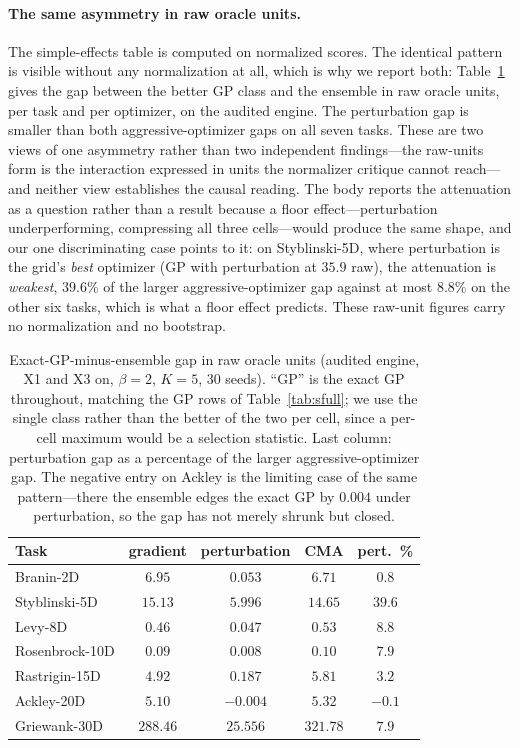 \documentclass[letterpaper]{article}
\theoremstyle{plain}
\begin{document}
\paragraph{The same asymmetry in raw oracle units.} The simple-effects table is computed on normalized scores. The identical pattern is visible without any normalization at all, which is why we report both: Table~\ref{tab:rawgap} gives the gap between the better GP class and the ensemble in raw oracle units, per task and per optimizer, on the audited engine. The perturbation gap is smaller than both aggressive-optimizer gaps on all seven tasks. These are two views of one asymmetry rather than two independent findings---the raw-units form is the interaction expressed in units the normalizer critique cannot reach---and neither view establishes the causal reading. The body reports the attenuation as a question rather than a result because a floor effect---perturbation underperforming, compressing all three cells---would produce the same shape, and our one discriminating case points to it: on Styblinski-5D, where perturbation is the grid's \emph{best} optimizer (GP with perturbation at $35.9$ raw), the attenuation is \emph{weakest}, $39.6\%$ of the larger aggressive-optimizer gap against at most $8.8\%$ on the other six tasks, which is what a floor effect predicts. These raw-unit figures carry no normalization and no bootstrap.

\begin{table}[t]\centering
\caption{Exact-GP-minus-ensemble gap in raw oracle units (audited engine, X1 and X3 on, $\beta{=}2$, $K{=}5$, 30 seeds). ``GP'' is the exact GP throughout, matching the GP rows of Table~\ref{tab:sfull}; we use the single class rather than the better of the two per cell, since a per-cell maximum would be a selection statistic. Last column: perturbation gap as a percentage of the larger aggressive-optimizer gap. The negative entry on Ackley is the limiting case of the same pattern---there the ensemble edges the exact GP by $0.004$ under perturbation, so the gap has not merely shrunk but closed.}
\label{tab:rawgap}
\setlength{\tabcolsep}{4pt}\small
\begin{tabular}{lcccc}
\toprule
Task & gradient & perturbation & CMA & pert.\ \% \\
\midrule
Branin-2D      & $6.95$   & $0.053$  & $6.71$   & $0.8$ \\
Styblinski-5D  & $15.13$  & $5.996$  & $14.65$  & $39.6$ \\
Levy-8D        & $0.46$   & $0.047$  & $0.53$   & $8.8$ \\
Rosenbrock-10D & $0.09$   & $0.008$  & $0.10$   & $7.9$ \\
Rastrigin-15D  & $4.92$   & $0.187$  & $5.81$   & $3.2$ \\
Ackley-20D     & $5.10$   & $-0.004$ & $5.32$   & $-0.1$ \\
Griewank-30D   & $288.46$ & $25.556$ & $321.78$ & $7.9$ \\
\bottomrule
\end{tabular}
\end{table}
\end{document}
